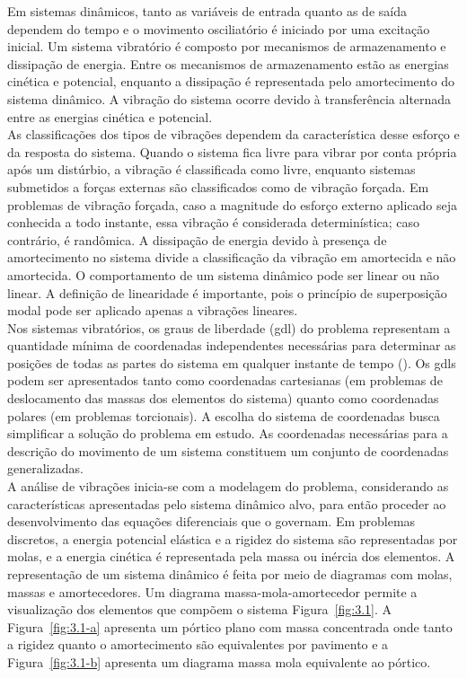     \indent Em sistemas dinâmicos, tanto as variáveis de entrada quanto as de saída dependem do tempo e o movimento osciliatório é iniciado por uma excitação inicial. Um sistema vibratório é composto por mecanismos de armazenamento e dissipação de energia. Entre os mecanismos de armazenamento estão as energias cinética e potencial, enquanto a dissipação é representada pelo amortecimento do sistema dinâmico. A vibração do sistema ocorre devido à transferência alternada entre as energias cinética e potencial.\\
    \indent As classificações dos tipos de vibrações dependem da característica desse esforço e da resposta do sistema. Quando o sistema fica livre para vibrar por conta própria após um distúrbio, a vibração é classificada como livre, enquanto sistemas submetidos a forças externas são classificados como de vibração forçada. Em problemas de vibração forçada, caso a magnitude do esforço externo aplicado seja conhecida a todo instante, essa vibração é considerada determinística; caso contrário, é randômica. A dissipação de energia devido à presença de amortecimento no sistema divide a classificação da vibração em amortecida e não amortecida. O comportamento de um sistema dinâmico pode ser linear ou não linear. A definição de linearidade é importante, pois o princípio de superposição modal pode ser aplicado apenas a vibrações lineares. \\
    \indent Nos sistemas vibratórios, os graus de liberdade (gdl) do problema representam a quantidade mínima de coordenadas independentes necessárias para determinar as posições de todas as partes do sistema em qualquer instante de tempo (\citet{vibrationcontinuoussystems2006}). Os gdls podem ser apresentados tanto como coordenadas cartesianas (em problemas de deslocamento das massas dos elementos do sistema) quanto como coordenadas polares (em problemas torcionais). A escolha do sistema de coordenadas busca simplificar a solução do problema em estudo. As coordenadas necessárias para a descrição do movimento de um sistema constituem um conjunto de coordenadas generalizadas.\\
    \indent A análise de vibrações inicia-se com a modelagem do problema, considerando as características apresentadas pelo sistema dinâmico alvo, para então proceder ao desenvolvimento das equações diferenciais que o governam. Em problemas discretos, a energia potencial elástica e a rigidez do sistema são representadas por molas, e a energia cinética é representada pela massa ou inércia dos elementos. A representação de um sistema dinâmico é feita por meio de diagramas com molas, massas e amortecedores. Um diagrama massa-mola-amortecedor permite a visualização dos elementos que compõem o sistema Figura~\ref{fig:3.1}. A Figura~\ref{fig:3.1-a} apresenta um pórtico plano com massa concentrada onde tanto a rigidez quanto o amortecimento são equivalentes por pavimento e a Figura~\ref{fig:3.1-b} apresenta um diagrama massa mola equivalente ao pórtico. \\

